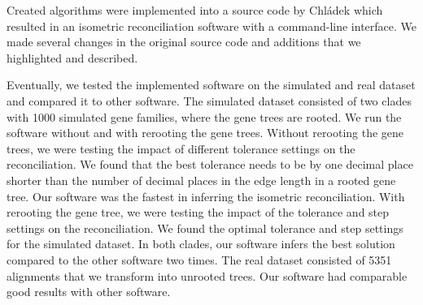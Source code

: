 Created algorithms were implemented into a source code by Chládek \cite{chladek_thesis} which resulted in an isometric reconciliation software with a command-line interface. We made several changes in the original source code and additions that we highlighted and described.

Eventually, we tested the implemented software on the simulated and real dataset and compared it to other software. The simulated dataset consisted of two clades with 1000 simulated gene families, where the gene trees are rooted. We run the software without and with rerooting the gene trees. Without rerooting the gene trees, we were testing the impact of different tolerance settings on the reconciliation. We found that the best tolerance needs to be by one decimal place shorter than the number of decimal places in the edge length in a rooted gene tree. Our software was the fastest in inferring the isometric reconciliation. With rerooting the gene tree, we were testing the impact of the tolerance and step settings on the reconciliation. We found the optimal tolerance and step settings for the simulated dataset. In both clades, our software infers the best solution compared to the other software two times. The real dataset consisted of 5351 alignments that we transform into unrooted trees. Our software had comparable good results with other software.




